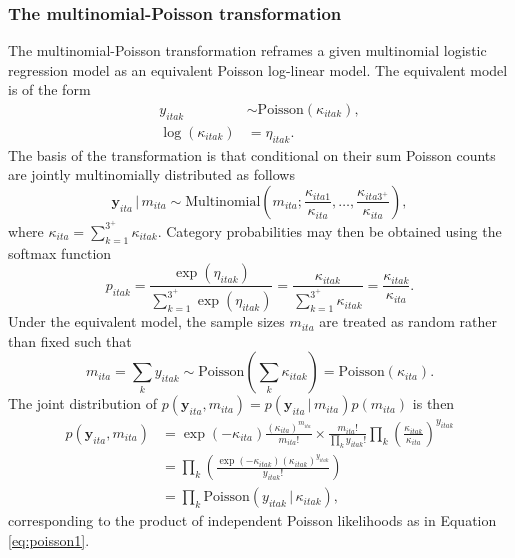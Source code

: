 \documentclass[a4paper, nobind]{templates/ociamthesis}
\begin{document}
\hypertarget{the-multinomial-poisson-transformation}{%
\subsubsection{The multinomial-Poisson transformation}\label{the-multinomial-poisson-transformation}}

The multinomial-Poisson transformation reframes a given multinomial logistic regression model as an equivalent Poisson log-linear model.
The equivalent model is of the form
\begin{align}
    y_{itak} &\sim \text{Poisson}(\kappa_{itak}), \label{eq:poisson1} \\
    \log(\kappa_{itak}) &= \eta_{itak}. \label{eq:poisson2}
\end{align}
The basis of the transformation is that conditional on their sum Poisson counts are jointly multinomially distributed \autocite{mccullagh1989generalized} as follows
\begin{equation}
    \mathbf{y}_{ita} \, | \, m_{ita} \sim \text{Multinomial} \left( m_{ita}; \frac{\kappa_{ita1}}{\kappa_{ita}}, \ldots, \frac{\kappa_{ita3^{+}}}{\kappa_{ita}} \right),
\end{equation}
where \(\kappa_{ita} = \sum_{k = 1}^{3^{+}} \kappa_{itak}\).
Category probabilities may then be obtained using the softmax function
\begin{equation}
    p_{itak} = \frac{\exp(\eta_{itak})}{\sum_{k = 1}^{3^{+}} \exp(\eta_{itak})} = \frac{\kappa_{itak}}{\sum_{k = 1}^{3^{+}} \kappa_{itak}} = \frac{\kappa_{itak}}{\kappa_{ita}}.
\end{equation}
Under the equivalent model, the sample sizes \(m_{ita}\) are treated as random rather than fixed such that
\begin{equation}
m_{ita} = \sum_k y_{itak} \sim \text{Poisson} \left( \sum_k \kappa_{itak} \right) = \text{Poisson} \left( \kappa_{ita} \right).
\end{equation}
The joint distribution of \(p(\mathbf{y}_{ita}, m_{ita}) = p(\mathbf{y}_{ita} \, | \, m_{ita})p(m_{ita})\) is then
\begin{align}
p(\mathbf{y}_{ita}, m_{ita}) &= \exp(-\kappa_{ita}) \frac{(\kappa_{ita})^{m_{ita}}}{m_{ita}!} \times \frac{m_{ita}!}{\prod_k y_{itak}!} \prod_k \left( \frac{\kappa_{itak}}{\kappa_{ita}} \right)^{y_{itak}} \\
&= \prod_k \left( \frac{\exp(-\kappa_{itak}) \left( \kappa_{itak} \right)^{y_{itak}}}{y_{itak}!} \right) \\
&= \prod_k \text{Poisson} \left( y_{itak} \, | \, \kappa_{itak} \right), \label{eq:prodpoisson}
\end{align}
corresponding to the product of independent Poisson likelihoods as in Equation \eqref{eq:poisson1}.
\end{document}

